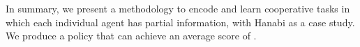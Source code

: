In summary, we present a methodology to encode and learn cooperative tasks in
which each individual agent has partial information, with Hanabi as a case
study. We produce a policy that can achieve an average score of .


%

